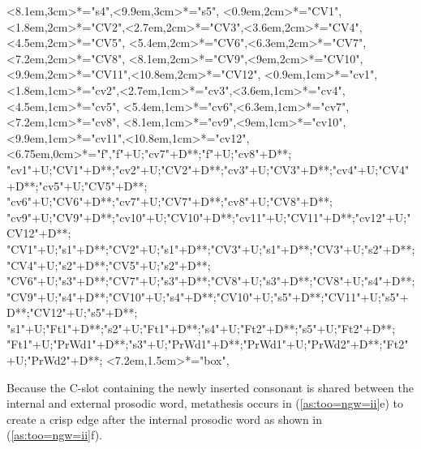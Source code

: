 \begin{multicols}{2}
\begin{exe}
{\begin{xlist}
{		<8.1em,3cm>*="s4",<9.9em,3cm>*="s5",
		<0.9em,2cm>*="CV1",<1.8em,2cm>*="CV2",<2.7em,2cm>*="CV3",<3.6em,2cm>*="CV4",<4.5em,2cm>*="CV5",
		<5.4em,2cm>*="CV6",<6.3em,2cm>*="CV7",<7.2em,2cm>*="CV8",
		<8.1em,2cm>*="CV9",<9em,2cm>*="CV10",<9.9em,2cm>*="CV11",<10.8em,2cm>*="CV12",
		<0.9em,1cm>*="cv1",<1.8em,1cm>*="cv2",<2.7em,1cm>*\as{ }="cv3",<3.6em,1cm>*="cv4",<4.5em,1cm>*\as{ }="cv5",
		<5.4em,1cm>*="cv6",<6.3em,1cm>*="cv7",<7.2em,1cm>*="cv8",
		<8.1em,1cm>*="cv9",<9em,1cm>*\as{ }="cv10",<9.9em,1cm>*="cv11",<10.8em,1cm>*\as{ }="cv12",
		<6.75em,0cm>*\as{\tsc{[+v.]}}="f","f"+U;"cv7"+D**\dir{-};"f"+U;"cv8"+D**\dir{-};
		"cv1"+U;"CV1"+D**\dir{-};"cv2"+U;"CV2"+D**\dir{-};"cv3"+U;"CV3"+D**\dir{};"cv4"+U;"CV4"+D**\dir{-};"cv5"+U;"CV5"+D**\dir{};
		"cv6"+U;"CV6"+D**\dir{-};"cv7"+U;"CV7"+D**\dir{-};"cv8"+U;"CV8"+D**\dir{-};
		"cv9"+U;"CV9"+D**\dir{-};"cv10"+U;"CV10"+D**\dir{};"cv11"+U;"CV11"+D**\dir{-};"cv12"+U;"CV12"+D**\dir{};
		"CV1"+U;"s1"+D**\dir{-};"CV2"+U;"s1"+D**\dir{-};"CV3"+U;"s1"+D**\dir{-};"CV3"+U;"s2"+D**\dir{-};"CV4"+U;"s2"+D**\dir{-};"CV5"+U;"s2"+D**\dir{-};
		"CV6"+U;"s3"+D**\dir{-};"CV7"+U;"s3"+D**\dir{-};"CV8"+U;"s3"+D**\dir{-};"CV8"+U;"s4"+D**\dir{-};
		"CV9"+U;"s4"+D**\dir{-};"CV10"+U;"s4"+D**\dir{-};"CV10"+U;"s5"+D**\dir{-};"CV11"+U;"s5"+D**\dir{-};"CV12"+U;"s5"+D**\dir{-};
		"s1"+U;"Ft1"+D**\dir{-};"s2"+U;"Ft1"+D**\dir{-};"s4"+U;"Ft2"+D**\dir{-};"s5"+U;"Ft2"+D**\dir{-};
		"Ft1"+U;"PrWd1"+D**\dir{-};"s3"+U;"PrWd1"+D**\dir{-};"PrWd1"+U;"PrWd2"+D**\dir{-};"Ft2"+U;"PrWd2"+D**\dir{-};
		<7.2em,1.5cm>*="box",
	\endxy}
	\end{xlist}}
\end{exe}
\end{multicols}

Because the C-slot containing the newly inserted consonant
is shared between the internal and external prosodic word,
metathesis occurs in (\ref{as:too=ngw=ii}e) to create a crisp edge
after the internal prosodic word as shown in (\ref{as:too=ngw=ii}f).

